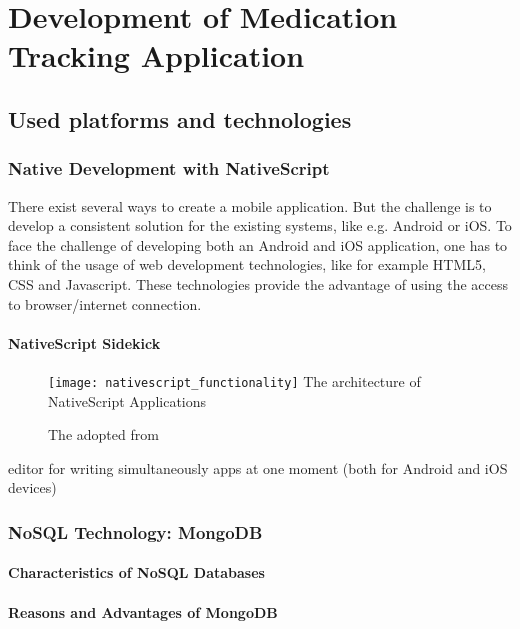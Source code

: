 \chapter{Development of Medication Tracking Application}
\label{Kap3}

\section{Used platforms and technologies} \label{platforms}

\subsection{Native Development with NativeScript} 

There exist several ways to create a mobile application. But the challenge is to develop a consistent solution for the existing systems, like e.g. Android or iOS.
To face the challenge of developing both an Android and iOS application, one has to think of the usage of web development technologies, like for example HTML5, CSS and Javascript. These technologies provide the advantage of using the access to browser/internet  connection.

\subsubsection{NativeScript Sidekick}

\begin{figure}
\centering
\texttt{[image: nativescript\_functionality]} The architecture of NativeScript Applications
\caption{\label{fig:nsarchitecture}The adopted from \cite{nsarchitecture}} 
\end{figure}



editor for writing simultaneously apps at one moment (both for Android and iOS devices)

\subsection{NoSQL Technology: MongoDB} \label{nosql}

\subsubsection{Characteristics of NoSQL Databases}

\subsubsection{Reasons and Advantages of MongoDB}

